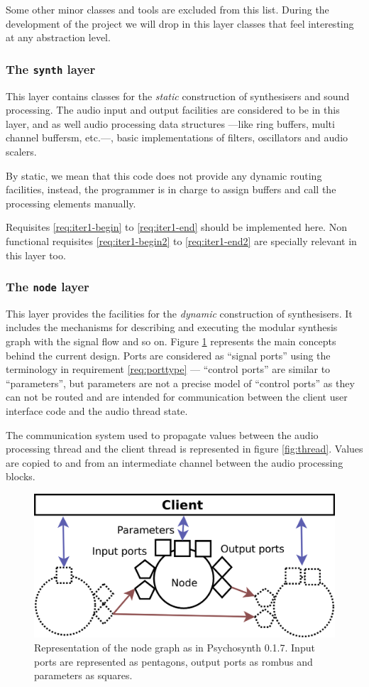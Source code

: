 Some other minor classes and tools are excluded from this list. During
the development of the project we will drop in this layer classes that
feel interesting at any abstraction level.

\subsubsection{The \texttt{synth} layer}

This layer contains classes for the \emph{static} construction of
synthesisers and sound processing. The audio input and output
facilities are considered to be in this layer, and as well audio
processing data structures ---like ring buffers, multi channel
buffersm, etc.---, basic implementations of filters, oscillators and
audio scalers.

By static, we mean that this code does not provide any dynamic routing
facilities, instead, the programmer is in charge to assign buffers and
call the processing elements manually.

Requisites \ref{req:iter1-begin} to \ref{req:iter1-end} should be
implemented here. Non functional requisites \ref{req:iter1-begin2} to
\ref{req:iter1-end2} are specially relevant in this layer too.

\subsubsection{The \texttt{node} layer}

This layer provides the facilities for the \emph{dynamic} construction
of synthesisers. It includes the mechanisms for describing and
executing the modular synthesis graph with the signal flow and so
on. Figure \ref{fig:node} represents the main concepts behind the
current design. Ports are considered as ``signal ports'' using the
terminology in requirement \ref{req:porttype} --- ``control ports''
are similar to ``parameters'', but parameters are not a precise model
of ``control ports'' as they can not be routed and are intended for
communication between the client user interface code and the audio
thread state.

The communication system used to propagate values between the audio
processing thread and the client thread is represented in figure
\ref{fig:thread}. Values are copied to and from an intermediate channel
between the audio processing blocks. 

\begin{figure}[h]
\centering
\includegraphics[width=.6\textwidth]{pic/node.png}
\caption[Representation of the node graph as in Psychosynth
0.1.7]{Representation of the node graph as in Psychosynth 0.1.7. Input
ports are represented as pentagons, output ports as rombus and
parameters as squares.}
\label{fig:node}
\end{figure}


